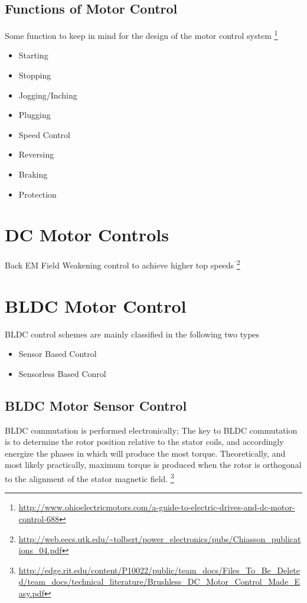 \documentclass[a4paper]{article}
\begin{document}
   \subsection{Functions of Motor Control}
    Some function to keep in mind for the design of the motor control system
        \footnote{\url{http://www.ohioelectricmotors.com/a-guide-to-electric-drives-and-dc-motor-control-688}}
    \begin{itemize}
    \item Starting
    \item Stopping
    \item Jogging/Inching
    \item Plugging
    \item Speed Control
    \item Reversing
    \item Braking
    \item Protection
    \end{itemize}

\section{DC Motor Controls}
    Back EM Field Weakening control to achieve higher top speeds
        \footnote{\url{http://web.eecs.utk.edu/~tolbert/power_electronics/pubs/Chiasson_publications_04.pdf}}

\section{BLDC Motor Control}
    BLDC control schemes are mainly classified in the following two types
    \begin{itemize}
    \item Sensor Based Control
    \item Sensorless Based Conrol
    \end{itemize}

\subsection{BLDC Motor Sensor Control}
    BLDC commutation is performed electronically;
    The key to BLDC commutation is to determine the rotor position relative to
    the stator coils, and
    accordingly energize the phases in which will produce the most torque.
    Theoretically, and most likely practically, maximum torque is produced when
    the rotor is orthogonal to the alignment of the stator magnetic field.
        \footnote{\url{http://edge.rit.edu/content/P10022/public/team_docs/Files_To_Be_Deleted/team_docs/technical_literature/Brushless_DC_Motor_Control_Made_Easy.pdf}}
\end{document}
